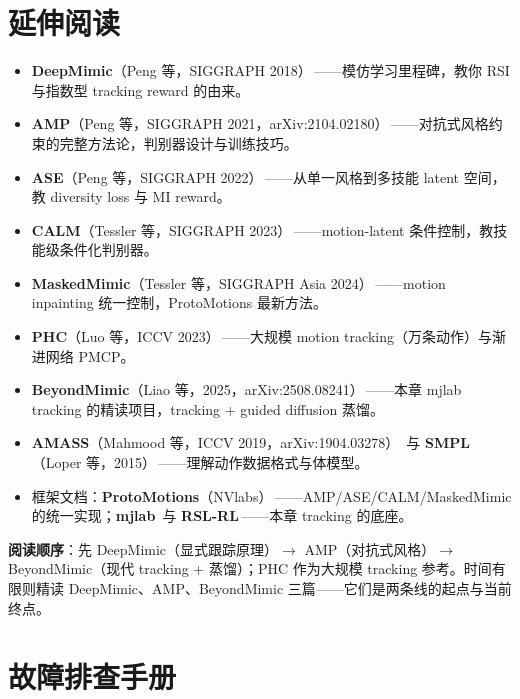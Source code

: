 \section*{延伸阅读}
\label{sec:rlmc-imit-reading}

\begin{itemize}
  \item \textbf{DeepMimic}（Peng 等，SIGGRAPH 2018）\,\cite{peng2018deepmimic}——模仿学习里程碑，教你 RSI 与指数型 tracking reward 的由来。
  \item \textbf{AMP}（Peng 等，SIGGRAPH 2021，arXiv:2104.02180）\,\cite{peng2021amp}——对抗式风格约束的完整方法论，判别器设计与训练技巧。
  \item \textbf{ASE}（Peng 等，SIGGRAPH 2022）\,\cite{peng2022ase}——从单一风格到多技能 latent 空间，教 diversity loss 与 MI reward。
  \item \textbf{CALM}（Tessler 等，SIGGRAPH 2023）\,\cite{tessler2023calm}——motion-latent 条件控制，教技能级条件化判别器。
  \item \textbf{MaskedMimic}（Tessler 等，SIGGRAPH Asia 2024）\,\cite{tessler2024maskedmimic}——motion inpainting 统一控制，ProtoMotions 最新方法。
  \item \textbf{PHC}（Luo 等，ICCV 2023）\,\cite{luo2023phc}——大规模 motion tracking（万条动作）与渐进网络 PMCP。
  \item \textbf{BeyondMimic}（Liao 等，2025，arXiv:2508.08241）\,\cite{liao2025beyondmimic}——本章 mjlab tracking 的精读项目，tracking + guided diffusion 蒸馏。
  \item \textbf{AMASS}（Mahmood 等，ICCV 2019，arXiv:1904.03278）\,\cite{mahmood2019amass} 与 \textbf{SMPL}（Loper 等，2015）\,\cite{loper2015smpl}——理解动作数据格式与体模型。
  \item 框架文档：\textbf{ProtoMotions}（NVlabs）\,\cite{protomotions2024}——AMP/ASE/CALM/MaskedMimic 的统一实现；\textbf{mjlab}\,\cite{mjlab2026} 与 \textbf{RSL-RL}\,\cite{schwarke2025rslrl}——本章 tracking 的底座。
\end{itemize}

\textbf{阅读顺序}：先 DeepMimic（显式跟踪原理）$\to$ AMP（对抗式风格）$\to$ BeyondMimic（现代 tracking + 蒸馏）；PHC 作为大规模 tracking 参考。时间有限则精读 DeepMimic、AMP、BeyondMimic 三篇——它们是两条线的起点与当前终点。

\section*{故障排查手册}
\label{sec:rlmc-imit-troubleshoot}

